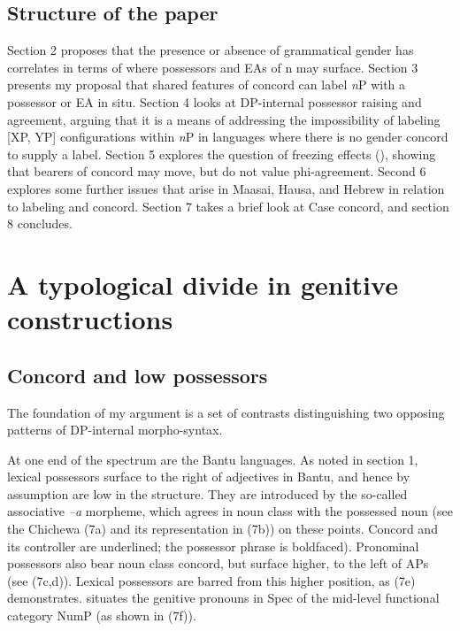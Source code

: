 \documentclass[output=paper
,modfonts
,nonflat]{langsci/langscibook}
\begin{document}
\subsection{Structure of the paper}
Section 2 proposes that the presence or absence of grammatical gender has correlates in terms of where possessors and EAs of n may surface. Section 3 presents my proposal that shared features of concord can label \textit{n}P with a possessor or EA in situ. Section 4 looks at DP-internal possessor raising and agreement, arguing that it is a means of addressing the impossibility of labeling [XP, YP] configurations within \textit{n}P in languages where there is no gender concord to supply a label. Section 5 explores the question of {\textquotedbl}freezing{\textquotedbl} effects (\citealt{Rizzi2006, Rizzi2007}), showing that bearers of concord may move, but do not value phi-agreement. Second 6 explores some further issues that arise in Maasai, Hausa, and Hebrew in relation to labeling and concord. Section 7 takes a brief look at Case concord, and section 8 concludes.

\section{A typological divide in genitive constructions}
\subsection{Concord and low possessors}
The foundation of my argument is a set of contrasts distinguishing two opposing patterns of DP-internal morpho-syntax. 

At one end of the spectrum are the Bantu languages. As noted in section 1, lexical possessors surface to the right of adjectives in Bantu, and hence by assumption are low in the structure. They are introduced by the so-called associative \textit{–a} morpheme, which agrees in noun class with the possessed noun (see the Chichewa (7a) and its representation in (7b)) on these points. Concord and its controller are underlined; the possessor phrase is boldfaced). Pronominal possessors also bear noun class concord, but surface higher, to the left of APs (see (7c,d)). Lexical possessors are barred from this higher position, as (7e) demonstrates. \citet{Carstens1991, Carstens1997} situates the genitive pronouns in Spec of the mid-level functional category NumP (as shown in (7f)).
\end{document}
